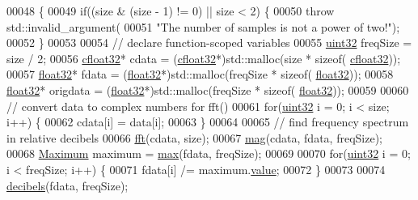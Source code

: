 \begin{DoxyCode}
00048                                                                          \{
00049         \textcolor{keywordflow}{if}((size & (size - 1) != 0) || size < 2) \{
00050             \textcolor{keywordflow}{throw} std::invalid\_argument(
00051                     \textcolor{stringliteral}{"The number of samples is not a power of two!"});
00052         \}
00053 
00054         \textcolor{comment}{// declare function-scoped variables}
00055         \hyperlink{definitions_8hpp_a1134b580f8da4de94ca6b1de4d37975e}{uint32} freqSize = size / 2;
00056         \hyperlink{definitions_8hpp_a960be6b6614c08090c16574dba10a421}{cfloat32}* cdata = (\hyperlink{definitions_8hpp_a960be6b6614c08090c16574dba10a421}{cfloat32}*)std::malloc(size * \textcolor{keyword}{sizeof}(
      \hyperlink{definitions_8hpp_a960be6b6614c08090c16574dba10a421}{cfloat32}));
00057         \hyperlink{definitions_8hpp_aacdc525d6f7bddb3ae95d5c311bd06a1}{float32}* fdata = (\hyperlink{definitions_8hpp_aacdc525d6f7bddb3ae95d5c311bd06a1}{float32}*)std::malloc(freqSize * \textcolor{keyword}{sizeof}(
      \hyperlink{definitions_8hpp_aacdc525d6f7bddb3ae95d5c311bd06a1}{float32}));
00058         \hyperlink{definitions_8hpp_aacdc525d6f7bddb3ae95d5c311bd06a1}{float32}* origdata = (\hyperlink{definitions_8hpp_aacdc525d6f7bddb3ae95d5c311bd06a1}{float32}*)std::malloc(freqSize * \textcolor{keyword}{sizeof}(
      \hyperlink{definitions_8hpp_aacdc525d6f7bddb3ae95d5c311bd06a1}{float32}));
00059 
00060         \textcolor{comment}{// convert data to complex numbers for fft()}
00061         \textcolor{keywordflow}{for}(\hyperlink{definitions_8hpp_a1134b580f8da4de94ca6b1de4d37975e}{uint32} i = 0; i < size; i++) \{
00062             cdata[i] = data[i];
00063         \}
00064     
00065         \textcolor{comment}{// find frequency spectrum in relative decibels}
00066         \hyperlink{namespaceavda_a33a1102422421212ac6b9387c896e864}{fft}(cdata, size);
00067         \hyperlink{namespaceavda_a213bd6384fc9a330e4db2cecdbcd73ee}{mag}(cdata, fdata, freqSize);
00068         \hyperlink{structMaximum}{Maximum} maximum = \hyperlink{namespaceavda_aa82021c3ee552773c060b1a39caf8aaa}{max}(fdata, freqSize);
00069 
00070         \textcolor{keywordflow}{for}(\hyperlink{definitions_8hpp_a1134b580f8da4de94ca6b1de4d37975e}{uint32} i = 0; i < freqSize; i++) \{
00071             fdata[i] /= maximum.\hyperlink{structMaximum_aa7e84cbf37b694670142670014366969}{value};
00072         \}
00073 
00074         \hyperlink{namespaceavda_a9c0b7f832eace3cbc9c5dddea2ecc9d5}{decibels}(fdata, freqSize);

\end{DoxyCode}
